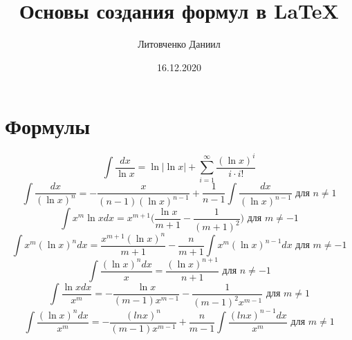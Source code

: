 \documentclass[a4paper,12pt]{article} %
\author{Литовченко Даниил}
\title{Основы создания формул в \LaTeX{}}
\date{16.12.2020}
\begin{document}

\maketitle
\newpage
\section{Формулы}
\begin{equation}
\int \frac{dx}{\ln x}=\ln|\ln x|+\sum_{i=1}^\infty \frac{(\ln x)^i}{i\cdot i!}
\end{equation}
\begin{equation}
\int \frac{dx}{(\ln x)^n}=-\frac{x}{(n-1)(\ln x)^{n-1}}+\frac{1}{n-1}\int \frac{dx}{(\ln x)^{n-1}}\text{ для } n\neq 1
\end{equation}
\begin{equation}
\int x^m \ln x dx=x^{m+1}\Bigg( \frac{\ln x}{m+1}-\frac{1}{(m+1)^2}\Bigg) \text{ для } m \neq -1
\end{equation}
\begin{equation}
\int x^m(\ln x)^n dx=\frac{x^{m+1}(\ln x)^n}{m+1}-\frac{n}{m+1}\int x^m(\ln x)^{n-1}dx \text{ для } m \neq -1
\end{equation}
\begin{equation}
\int\frac{(\ln x)^n dx}{x}=\frac{(\ln x)^{n+1}}{n+1} \text{ для } n\neq -1
\end{equation}
\begin{equation}
\int \frac{\ln x dx}{x^m}=-\frac{\ln x}{(m-1)x^{m-1}}-\frac{1}{(m-1)^2 x^{m-1}} \text{ для } m \neq 1
\end{equation}
\begin{equation}
\int \frac{(\ln x)^n dx}{x^m}=-\frac{(ln x)^n}{(m-1)x^{m-1}}+\frac{n}{m-1}\int\frac{(ln x)^{n-1}dx}{x^m} \text{ для } m\neq 1 
\end{equation}
\end{document}
